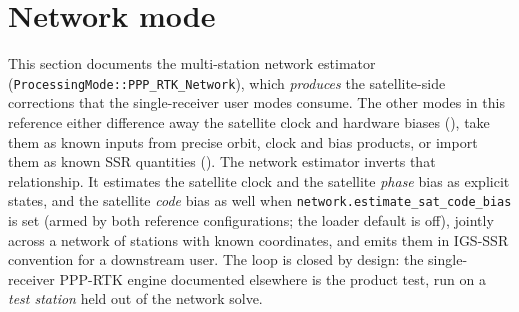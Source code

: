 \documentclass[main.tex]{subfiles}
\begin{document}

\section{Network mode}\label{sec:net}

\newcommand{\Nss}{\bm{N}_{ss}}          %
\newcommand{\Nrr}{\bm{N}_{rr}}          %
\newcommand{\Nsr}{\bm{N}_{sr}}          %
\newcommand{\redNss}{\tilde{\bm{N}}_{ss}} %
\newcommand{\redus}{\tilde{\bm{u}}_s}   %
\newcommand{\xshared}{\bm{x}_s}         %
\newcommand{\xlocal}[1]{\bm{x}_{#1}}    %
\newcommand{\satbiasPB}{\bar b}         %
\newcommand{\satbiasCB}{B}              %

This section documents the multi-station network estimator
(\texttt{ProcessingMode::PPP\_RTK\_Network}), which \emph{produces} the
satellite-side corrections that the single-receiver user modes consume.
The other modes in this reference either difference away the satellite
clock and hardware biases (),
take them as known inputs from precise orbit, clock and bias products,
or import them as known SSR quantities
(). The network estimator
inverts that relationship. It estimates the satellite clock and the
satellite \emph{phase} bias as explicit states, and the satellite
\emph{code} bias as well when \texttt{network.estimate\_sat\_code\_bias}
is set (armed by both reference configurations; the loader default is
off), jointly across a network of stations with known coordinates, and
emits them in IGS-SSR convention for a downstream user. The loop is
closed by design: the single-receiver PPP-RTK engine documented
elsewhere is the product test, run on a \emph{test station} held out of
the network solve.
\end{document}
